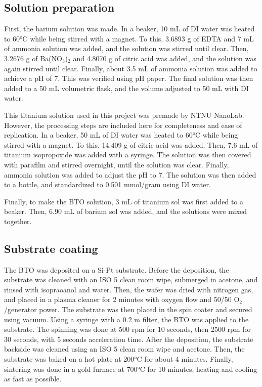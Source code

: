 \subsection{Solution preparation}

\noindent First, the barium solution was made.
In a beaker, 10 mL of DI water was heated to 60°C while being stirred with a magnet.
To this, 3.6893 g of EDTA and 7 mL of ammonia solution was added, and the solution was stirred until clear.
Then, 3.2676 g of Ba(NO$_3$)$_2$ and 4.8070 g of citric acid was added, and the solution was again stirred until clear.
Finally, about 3.5 mL of ammonia solution was added to achieve a pH of 7. 
This was verified using pH paper.
The final solution was then added to a 50 mL volumetric flask, and the volume adjusted to 50 mL with DI water.


This titanium solution used in this project was premade by NTNU NanoLab.
However, the processing steps are included here for completeness and ease of replication.
In a beaker, 50 mL of DI water was heated to 60°C while being stirred with a magnet.
To this, 14.409 g of citric acid was added.
Then, 7.6 mL of titanium isopropoxide was added with a syringe.
The solution was then covered with parafilm and stirred overnight, until the solution was clear.
Finally, ammonia solution was added to adjust the pH to 7.
The solution was then added to a bottle, and standardized to 0.501 mmol/gram using DI water.

Finally, to make the BTO solution, 3 mL of titanium sol was first added to a beaker. 
Then, 6.90 mL of barium sol was added, and the solutions were mixed together.

\subsection{Substrate coating}

\noindent The BTO was deposited on a Si-Pt substrate.
Before the deposition, the substrate was cleaned with an ISO 5 clean room wipe, submerged in acetone, and rinsed with isopraoanol and water.
Then, the wafer was dried with nitrogen gas, and placed in a plasma cleaner for 2 minutes with oxygen flow and 50/50 O$_2$/generator power.
The substrate was then placed in the spin coater and secured using vacuum.
Using a syringe with a 0.2 \textmu m filter, the BTO was applied to the substrate.
The spinning was done at 500 rpm for 10 seconds, then 2500 rpm for 30 seconds, with 5 seconds acceleration time.
After the deposition, the substrate backside was cleaned using an ISO 5 clean room wipe and acetone.
Then, the substrate was baked on a hot plate at 200°C for about 4 minutes.
Finally, sintering was done in a gold furnace at 700°C for 10 minutes, heating and cooling as fast as possible.

